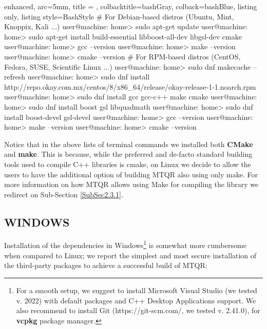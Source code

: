 \documentclass[a4paper, twosided]{book}
\begin{document}
\vspace{0.2cm}
\begin{tcblisting}{enhanced,
                   arc=5mm,
                   title = \color{black}{\large \ttfamily Installation of third-party libraries (Linux)},
                   colbacktitle=bashGray,
                   colback=bashBlue,
                   listing only,
                   listing style=BashStyle}
# For Debian-based distros (Ubuntu, Mint, Knoppix, Kali ...)
user@machine: home> sudo apt-get update
user@machine: home> sudo apt-get install build-essential libboost-all-dev libgsl-dev cmake
user@machine: home> gcc --version
user@machine: home> make --version
user@machine: home> cmake --version
# For RPM-based distros (CentOS, Fedora, SUSE, Scientific Linux ...)
user@machine: home> sudo dnf makecache --refresh
user@machine: home> sudo dnf install http://repo.okay.com.mx/centos/8/x86_64/release/okay-release-1-1.noarch.rpm
user@machine: home> sudo dnf install gcc gcc-c++ make cmake
user@machine: home> sudo dnf install boost gsl libquadmath
user@machine: home> sudo dnf install boost-devel gsl-devel
user@machine: home> gcc --version
user@machine: home> make --version
user@machine: home> cmake --version
\end{tcblisting}
\vspace{0.3cm}

\noindent
Notice that in the above lists of terminal commands we installed both \color{poliDarkBlue} \textbf{CMake} \color{black} and \color{poliDarkBlue} \textbf{make}\color{black}. This is because, while the preferred and de-facto standard building tools used to compile C++ libraries is \colorbox{poliGrayBlue}{cmake}, on Linux we decide to allow the users to have the additional option of building MTQR also using only \colorbox{poliGrayBlue}{make}. For more information on how MTQR allows using Make for compiling the library we redirect on Sub-Section \ref{SubSec2.3.1}.

\subsection[Windows]{\changefont WINDOWS}\label{SubSec2.1.2}

Installation of the dependencies in Windows\footnote{For a smooth setup, we suggest to install Microsoft Visual Studio (we tested v. 2022) with default packages and C++ Desktop Applications support. We also recommend to install Git (https://git-scm.com/, we tested v. 2.41.0), for \color{poliDarkBlue} \textbf{vcpkg} \color{black} package manager.} is somewhat more cumbersome when compared to Linux; we report the simplest and most secure installation of the third-party packages to achieve a successful build of MTQR:
\end{document}
